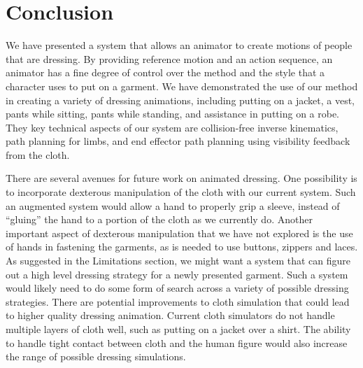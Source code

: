 \section{Conclusion}

We have presented a system that allows an animator to create motions
of people that are dressing.  By providing reference motion and an
action sequence, an animator has a fine degree of control over the
method and the style that a character uses to put on a garment.  We
have demonstrated the use of our method in creating a variety of
dressing animations, including putting on a jacket, a vest, pants
while sitting, pants while standing, and assistance in putting on a
robe.  They key technical aspects of our system are collision-free
inverse kinematics, path planning for limbs, and end effector path
planning using visibility feedback from the cloth. 

There are several avenues for future work on animated dressing.  One
possibility is to incorporate dexterous manipulation of the cloth with our
current system.  Such an augmented system would allow a hand to properly
grip a sleeve, instead of ``gluing'' the hand to a portion of the cloth as
we currently do.  Another important aspect of dexterous manipulation that
we have not explored is the use of hands in fastening the garments, as is
needed to use buttons, zippers and laces.  As suggested in the Limitations
section, we might want a system that can figure out a high level dressing
strategy for a newly presented garment.  Such a system would likely need
to do some form of search across a variety of possible dressing
strategies.  There are potential improvements to cloth simulation that
could lead to higher quality dressing animation.  Current cloth simulators
do not handle multiple layers of cloth well, such as putting on a jacket
over a shirt.  The ability to handle tight contact between cloth and
the human figure would also increase the range of possible dressing
simulations.

